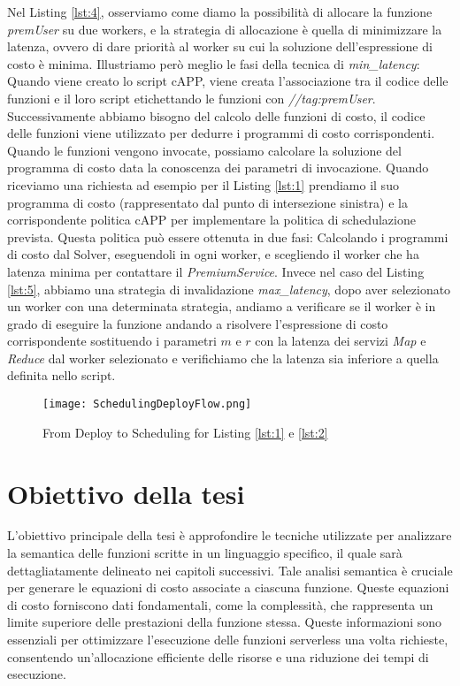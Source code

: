 \documentclass[../../main.tex]{subfiles}
\begin{document}
Nel Listing \ref{lst:4}, osserviamo come diamo la possibilità di allocare la funzione \textit{premUser} su due workers, e la strategia di allocazione è quella di minimizzare la latenza, ovvero di dare priorità al worker su cui la soluzione dell'espressione di costo è minima.
Illustriamo però meglio le fasi della tecnica di \textit{min\_latency}:\\
Quando viene creato lo script cAPP, viene creata l'associazione tra il codice delle funzioni e il loro script etichettando le funzioni con \textit{//tag:premUser}.
Successivamente abbiamo bisogno del calcolo delle funzioni di costo, il codice delle funzioni viene utilizzato per dedurre i programmi di costo corrispondenti.
Quando le funzioni vengono invocate, possiamo calcolare la soluzione del programma di costo data la conoscenza dei parametri di invocazione.
Quando riceviamo una richiesta ad esempio per il Listing \ref{lst:1} prendiamo il suo programma di costo (rappresentato dal punto di intersezione sinistra) e la corrispondente politica cAPP per implementare la politica di schedulazione prevista.
Questa politica può essere ottenuta in due fasi: Calcolando i programmi di costo dal Solver, eseguendoli in ogni worker, e scegliendo il worker che ha latenza minima per contattare il \textit{PremiumService}.
Invece nel caso del Listing \ref{lst:5}, abbiamo una strategia di invalidazione \textit{max\_latency}, dopo aver selezionato un worker con una determinata strategia, andiamo a verificare se il worker è in grado di eseguire la funzione andando a risolvere l'espressione di costo corrispondente sostituendo i parametri $m$ e $r$ con la latenza dei servizi \textit{Map} e \textit{Reduce} dal worker selezionato e verifichiamo che la latenza sia inferiore a quella definita nello script.\autocite{deserverless}
\begin{figure}[H]
    \texttt{[image: SchedulingDeployFlow.png]}
    \centering
    \caption{From Deploy to Scheduling for Listing \ref{lst:1} e \ref{lst:2} }
\end{figure}

\section{Obiettivo della tesi}
L'obiettivo principale della tesi è approfondire le tecniche utilizzate per analizzare la semantica delle funzioni scritte in un linguaggio specifico, il quale sarà dettagliatamente delineato nei capitoli successivi. Tale analisi semantica è cruciale per generare le equazioni di costo associate a ciascuna funzione. Queste equazioni di costo forniscono dati fondamentali, come la complessità, che rappresenta un limite superiore delle prestazioni della funzione stessa. Queste informazioni sono essenziali per ottimizzare l'esecuzione delle funzioni serverless una volta richieste, consentendo un'allocazione efficiente delle risorse e una riduzione dei tempi di esecuzione.
\end{document}
